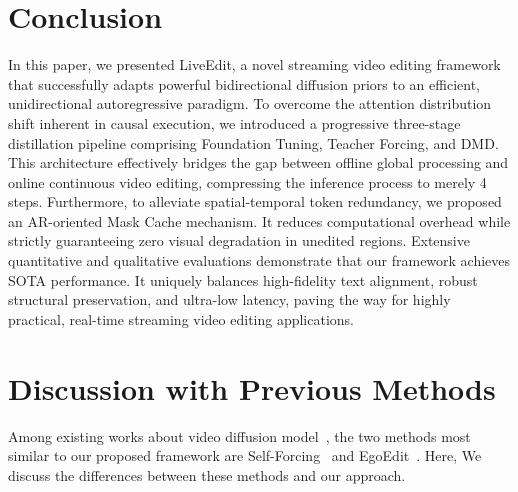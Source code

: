 \documentclass{llmxive}
\providecommand{\thepage}{S\arabic{page}}
\providecommand{\maketitlesupplementary}{
   \newpage
       \twocolumn[
        \centering
        \Large
        \textbf{\thetitle}\\
        \vspace{0.5em}Supplementary Material \\
        \vspace{1.0em}
       ] %
   }
\begin{document}
\section{Conclusion}
\label{sec:conclusion}

 In this paper, we presented LiveEdit, a novel streaming video editing framework that successfully adapts powerful bidirectional diffusion priors to an efficient, unidirectional autoregressive paradigm. To overcome the attention distribution shift inherent in causal execution, we introduced a progressive three-stage distillation pipeline comprising Foundation Tuning, Teacher Forcing, and DMD. This architecture effectively bridges the gap between offline global processing and online continuous video editing, compressing the inference process to merely 4 steps. Furthermore, to alleviate spatial-temporal token redundancy, we proposed an AR-oriented Mask Cache mechanism. It reduces computational overhead while strictly guaranteeing zero visual degradation in unedited regions. Extensive quantitative and qualitative evaluations demonstrate that our framework achieves SOTA performance. It uniquely balances high-fidelity text alignment, robust structural preservation, and ultra-low latency, paving the way for highly practical, real-time streaming video editing applications.






\setcounter{page}{1}
\maketitlesupplementary



\tableofcontents
\setcounter{page}{1}
\renewcommand{\thepage}{S\arabic{page}}
\setcounter{section}{0}
\setcounter{figure}{0}
\setcounter{table}{0}

\appendix


\section{Discussion with Previous Methods}

Among existing works about video diffusion model~\cite{ma2025followfaster, ma2024followyouremoji, song2026vista, song2026streamingeffect, gao2026pai, song2024processpainter, Deng_2026_CVPR, deng2024compact, wu2025freeswim, wu2026vibe, liang2026spongebob, liang2026cot, xu2026smrabooth}, the two methods most similar to our proposed framework are Self-Forcing~\cite{huang2025self} and EgoEdit~\cite{li2025egoedit}. Here, We discuss the differences between these methods and our approach.
\end{document}
